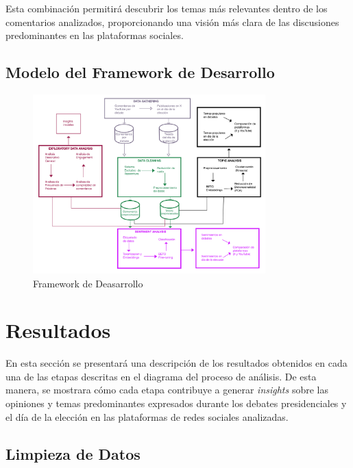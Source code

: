 \documentclass[10pt, a4paper]{article}
\begin{document}
	Esta combinación permitirá descubrir los temas más relevantes dentro de los comentarios analizados, proporcionando una visión más clara de las discusiones predominantes en las plataformas sociales.
	
	\subsection{Modelo del Framework de Desarrollo}
	
	\begin{figure}[h!] %
		\centering
		\includegraphics[width=0.8\textwidth]{diagrama.pdf} %
		\caption{Framework de Deasarrollo} %
		\label{fig:framework} %
	\end{figure}
	
	
	\section{Resultados}
	
	En esta sección se presentará una descripción de los resultados obtenidos en cada una de las etapas descritas en el diagrama del proceso de análisis. De esta manera, se mostrara cómo cada etapa contribuye a generar \textit{insights} sobre las opiniones y temas predominantes expresados durante los debates presidenciales y el día de la elección en las plataformas de redes sociales analizadas.
	
	\subsection{Limpieza de Datos}
	
\end{document}
